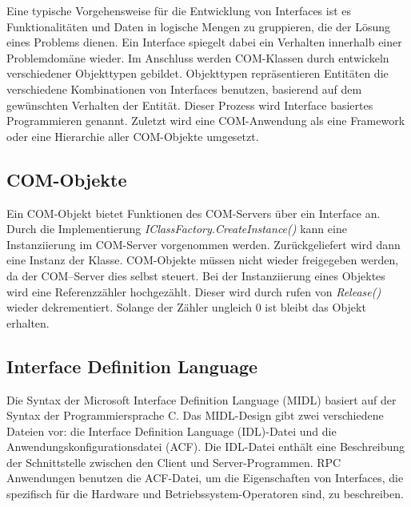 Eine typische Vorgehensweise für die Entwicklung von Interfaces ist es Funktionalitäten und Daten in logische Mengen zu gruppieren, die der Lösung eines Problems dienen. Ein Interface spiegelt dabei ein Verhalten innerhalb einer Problemdomäne wieder. Im Anschluss werden COM-Klassen durch entwickeln verschiedener Objekttypen gebildet. Objekttypen repräsentieren Entitäten die verschiedene Kombinationen von Interfaces benutzen, basierend auf dem gewünschten Verhalten der Entität. Dieser Prozess wird Interface basiertes Programmieren genannt. Zuletzt wird eine COM-Anwendung als eine Framework oder eine Hierarchie aller COM-Objekte umgesetzt.

\subsection{COM-Objekte}
\label{ch:grundlagen:sec:ComponentObjectModel:subsec:COMObjekte}

Ein COM-Objekt bietet Funktionen des COM-Servers über ein Interface an. Durch die Implementierung \textit{IClassFactory.CreateInstance()} kann eine Instanziierung im COM-Server vorgenommen werden. Zurückgeliefert wird dann eine Instanz der Klasse. COM-Objekte müssen nicht wieder freigegeben werden, da der COM–Server dies selbst steuert. Bei der Instanziierung eines Objektes  wird eine Referenzzähler hochgezählt. Dieser wird durch rufen von \textit{Release()} wieder dekrementiert. Solange der Zähler ungleich 0 ist bleibt das Objekt erhalten. 

\subsection{Interface Definition Language}
\label{ch:grundlagen:sec:ComponentObjectModel:subsec:InterfaceDefinitionLanguage}

Die Syntax der Microsoft Interface Definition Language (MIDL) basiert auf der Syntax der Programmiersprache C. Das MIDL-Design gibt zwei verschiedene Dateien vor: die Interface Definition Language (IDL)-Datei und die Anwendungskonfigurationsdatei (ACF). Die IDL-Datei enthält eine Beschreibung der Schnittstelle zwischen den Client und Server-Programmen. RPC Anwendungen benutzen die ACF-Datei, um die Eigenschaften von Interfaces, die spezifisch für die Hardware und Betriebssystem-Operatoren sind, zu beschreiben.